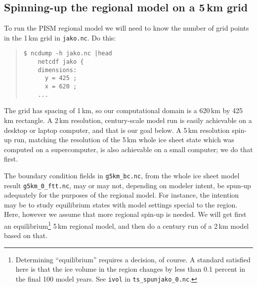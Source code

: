 \subsection*{Spinning-up the regional model on a 5\,km grid}
To run the PISM regional model we will need to know the number of grid points in the 1\,km grid in \verb|jako.nc|.  Do this:
\begin{quote}\small
\begin{verbatim}
$ ncdump -h jako.nc |head
    netcdf jako {
    dimensions:
      y = 425 ;
      x = 620 ;
    ...
\end{verbatim}
\normalsize\end{quote}
The grid has spacing of 1\,km, so our computational domain is a 620\,km by 425\,km rectangle.  A 2\,km resolution, century-scale model run is easily achievable on a desktop or laptop computer, and that is our goal below.  A 5\,km resolution spin-up run, matching the resolution of the 5\,km whole ice sheet state which was computed on a supercomputer, is also achievable on a small computer; we do that first.

The boundary condition fields in \verb|g5km_bc.nc|, from the whole ice sheet model result  \verb|g5km_0_ftt.nc|, may or may not, depending on modeler intent, be spun-up adequately for the purposes of the regional model.  For instance, the intention may be to study equilibrium states with model settings special to the region.  Here, however we assume that more regional spin-up is needed.  We will get first an equilibrium\footnote{Determining ``equilibrium'' requires a decision, of course.  A standard satisfied here is that the ice volume in the region changes by less than 0.1 percent in the final 100 model years.  See \texttt{ivol} in \texttt{ts_spunjako_0.nc}.} 5\,km regional model, and then do a century run of a 2\,km model based on that.

